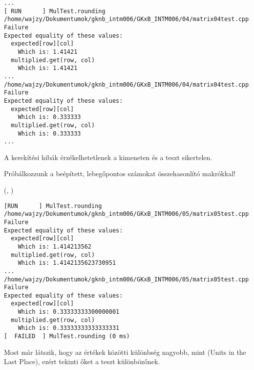 \begin{frame}[fragile]
  \begin{block}{}
    \scriptsize
    \vspace{-.5cm}
    \begin{verbatim}
...
[ RUN      ] MulTest.rounding
/home/wajzy/Dokumentumok/gknb_intm006/GKxB_INTM006/04/matrix04test.cpp:49: Failure
Expected equality of these values:
  expected[row][col]
    Which is: 1.41421
  multiplied.get(row, col)
    Which is: 1.41421
...
/home/wajzy/Dokumentumok/gknb_intm006/GKxB_INTM006/04/matrix04test.cpp:49: Failure
Expected equality of these values:
  expected[row][col]
    Which is: 0.333333
  multiplied.get(row, col)
    Which is: 0.333333
...
\end{verbatim}
    \vspace{-.4cm}
  \end{block}
  A kerekítési hibák érzékelhetetlenek a kimeneten és a teszt sikertelen.
\end{frame}


\begin{frame}
  Próbálkozzunk a beépített, lebegőpontos számokat összehasonlító makrókkal!
  \begin{exampleblock}{ %
    (, %
     )}
    \footnotesize
    
  \end{exampleblock}
\end{frame}

\begin{frame}[fragile]
  \begin{block}{}
    \scriptsize
    \vspace{-.5cm}
    \begin{verbatim}
[RUN      ] MulTest.rounding
/home/wajzy/Dokumentumok/gknb_intm006/GKxB_INTM006/05/matrix05test.cpp:50: Failure
Expected equality of these values:
  expected[row][col]
    Which is: 1.414213562
  multiplied.get(row, col)
    Which is: 1.4142135623730951
...
/home/wajzy/Dokumentumok/gknb_intm006/GKxB_INTM006/05/matrix05test.cpp:50: Failure
Expected equality of these values:
  expected[row][col]
    Which is: 0.33333333300000001
  multiplied.get(row, col)
    Which is: 0.33333333333333331
[  FAILED  ] MulTest.rounding (0 ms)
\end{verbatim}
    \vspace{-.4cm}
  \end{block}
  Most már látszik, hogy az értékek közötti különbség nagyobb, mint %
  (Units in the Last Place), ezért tekinti őket a teszt különbözőnek.
\end{frame}

